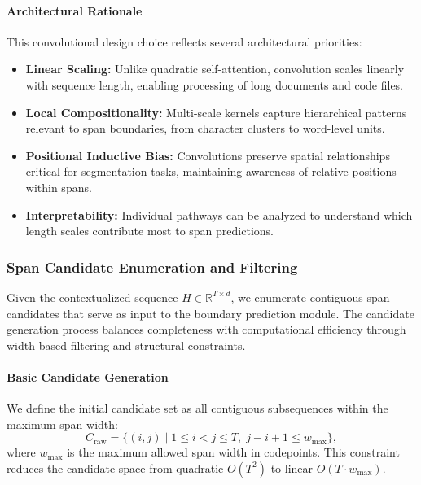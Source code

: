 \paragraph{Architectural Rationale}

This convolutional design choice reflects several architectural priorities:

\begin{itemize}
	\item \textbf{Linear Scaling:} Unlike quadratic self-attention, convolution scales linearly with sequence length, enabling processing of long documents and code files.
	\item \textbf{Local Compositionality:} Multi-scale kernels capture hierarchical patterns relevant to span boundaries, from character clusters to word-level units.
	\item \textbf{Positional Inductive Bias:} Convolutions preserve spatial relationships critical for segmentation tasks, maintaining awareness of relative positions within spans.
	\item \textbf{Interpretability:} Individual pathways can be analyzed to understand which length scales contribute most to span predictions.
\end{itemize}

\subsubsection{Span Candidate Enumeration and Filtering}
\label{sec:span-candidates}

Given the contextualized sequence \(H \in \mathbb{R}^{T \times d}\), we enumerate contiguous span candidates that serve as input to the boundary prediction module. The candidate generation process balances completeness with computational efficiency through width-based filtering and structural constraints.

\paragraph{Basic Candidate Generation}

We define the initial candidate set as all contiguous subsequences within the maximum span width:
\begin{equation}
C_{\text{raw}} = \{(i,j) \mid 1 \leq i < j \leq T, \; j - i + 1 \leq w_{\max}\},
\label{eq:raw-candidates}
\end{equation}
where \(w_{\max}\) is the maximum allowed span width in codepoints. This constraint reduces the candidate space from quadratic \(O(T^2)\) to linear \(O(T \cdot w_{\max})\).

